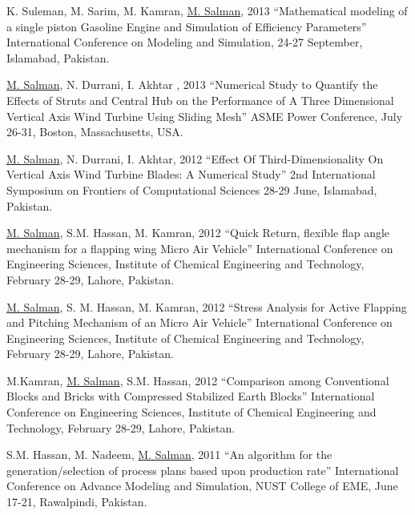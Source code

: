 \begin{cventries}
{\begin{cvitems}
          \item{K. Suleman, M. Sarim, M. Kamran, \underline{M. Salman}, 2013 “Mathematical modeling of a single piston Gasoline Engine and Simulation of Efficiency Parameters” International Conference on Modeling and Simulation, 24-27 September, Islamabad, Pakistan.}
          \item{\underline{M. Salman}, N.  Durrani, I. Akhtar , 2013 “Numerical Study to Quantify the Effects of Struts and Central Hub on the Performance of A Three Dimensional Vertical Axis Wind Turbine Using Sliding Mesh” ASME Power Conference, July 26-31, Boston, Massachusetts, USA.}
          \item{\underline{M. Salman}, N.  Durrani, I. Akhtar, 2012 “Effect Of Third-Dimensionality On Vertical Axis Wind Turbine Blades: A Numerical Study” 2nd International Symposium on Frontiers of Computational Sciences 28-29 June, Islamabad, Pakistan.}
               \item{\underline{M. Salman}, S.M. Hassan, M. Kamran, 2012 “Quick Return, flexible flap angle mechanism for a flapping wing Micro Air Vehicle” International Conference on Engineering Sciences, Institute of Chemical Engineering and Technology, February 28-29, Lahore, Pakistan.}
               \item{\underline{M. Salman}, S. M. Hassan, M. Kamran, 2012 “Stress Analysis for Active Flapping and Pitching Mechanism of an Micro Air Vehicle” International Conference on Engineering Sciences, Institute of Chemical Engineering and Technology, February 28-29, Lahore, Pakistan.}
               \item{M.Kamran, \underline{M. Salman}, S.M. Hassan, 2012 “Comparison among Conventional Blocks and Bricks with Compressed Stabilized Earth Blocks” International Conference on Engineering Sciences, Institute of Chemical Engineering and Technology, February 28-29, Lahore, Pakistan.}
               \item{S.M. Hassan, M. Nadeem, \underline{M. Salman}, 2011 “An algorithm for the generation/selection of process plans based upon production rate” International Conference on Advance Modeling and Simulation, NUST College of EME, June 17-21, Rawalpindi, Pakistan.}    
      \end{cvitems}
    }


\end{cventries}
